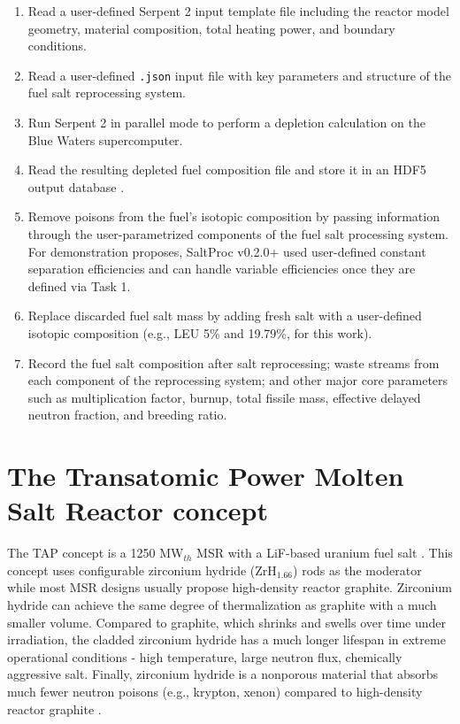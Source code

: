 \documentclass[12pt]{article} %
\begin{document}
\begin{enumerate}
        \item Read a user-defined Serpent 2 \cite{leppanen_serpent_2014} input 
                template file including the reactor  model geometry, material 
                composition, total heating power, and boundary conditions.
        \item Read a user-defined \texttt{.json} input file with key parameters 
                and structure of the fuel salt reprocessing system.
	\item Run Serpent 2 in parallel mode to perform a depletion calculation 
                on the Blue Waters supercomputer.
	\item Read the resulting depleted fuel composition file and store it in 
                an HDF5 output database \cite{the_hdf_group_hierarchical_1997}.
        \item Remove poisons from the fuel's isotopic composition by passing 
                information through the user-parametrized components of the 
                fuel salt processing system. For demonstration proposes, 
                SaltProc v0.2.0+ used user-defined constant separation 
                efficiencies and can handle variable efficiencies once they are 
                defined via Task 1.
        \item Replace discarded fuel salt mass by adding fresh salt with a user-defined 
                isotopic composition (e.g., \gls{LEU} 5\% and 19.79\%, for this 
                work).
        \item Record the fuel salt composition after salt reprocessing; waste 
                streams from each component of the reprocessing system; and 
                other major core parameters such as multiplication factor, 
                burnup, total fissile mass, effective delayed neutron fraction, 
                and breeding ratio.
\end{enumerate}

\section{The Transatomic Power Molten Salt Reactor concept}
The \gls{TAP} concept is a 1250 MW$_{th}$ \gls{MSR} with a LiF-based uranium 
fuel salt \cite{transatomic_power_corporation_technical_2016}. This concept 
uses configurable zirconium hydride (ZrH$_{1.66}$) rods as the moderator while 
most \gls{MSR} designs usually propose high-density reactor graphite. 
Zirconium hydride can achieve the same degree of thermalization as graphite 
with a much smaller volume. Compared to graphite, which shrinks and swells 
over time under irradiation, the cladded zirconium hydride has a much 
longer lifespan in extreme operational conditions - high temperature, large 
neutron flux, chemically aggressive salt. Finally, zirconium hydride is a 
nonporous material that absorbs much fewer neutron poisons (e.g., krypton, 
xenon) compared to high-density reactor graphite 
\cite{transatomic_power_corporation_technical_2016, 
transatomic_power_corporation_neutronics_2016, betzler_two-dimensional_2016}.
\end{document}
